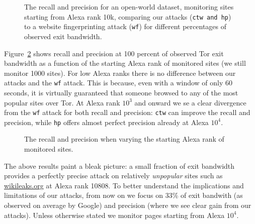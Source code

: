 \begin{figure}[t]
\centering
{}
\caption{The recall and precision for an open-world dataset, monitoring sites
starting from Alexa rank 10k, comparing our attacks (\texttt{ctw and
 \texttt{hp}}) to a website fingerprinting attack (\texttt{wf}) for different
 percentages of observed exit bandwidth. }
\label{fig:wfdns:torpct}
\end{figure}


Figure~\ref{fig:wfdns:alexa} shows recall and precision at 100 percent of
observed Tor exit bandwidth as a function of the starting Alexa rank of
monitored sites (we still monitor 1000 sites).
For low Alexa ranks there is no difference between our attacks and the
\texttt{wf} attack. This is because, even with a window of only 60 seconds,
it is virtually guaranteed that someone browsed to any of the most popular
sites over Tor. At Alexa rank $10^3$ and onward we se a clear divergence from
the \texttt{wf} attack for both recall and precision:
\texttt{ctw} can improve the recall and precision, while
\texttt{hp} offers almost perfect precision already at Alexa $10^4$.

\begin{figure}[t]
\centering
{}
\caption{The recall and precision when varying the starting Alexa rank of
monitored sites.}
\label{fig:wfdns:alexa}
\end{figure}

The above results paint a bleak picture: a small fraction of exit
bandwidth provides a perfectly precise attack on relatively
\emph{unpopular} sites such as \url{wikileaks.org} at Alexa rank 10808.
To better understand the implications and limitations of our attacks,
from now on we focus on
33\% of exit bandwith (as observed on average by Google) and
precision (where we see clear gain from our attacks). Unless otherwise stated
we monitor pages starting from Alexa $10^4$.

